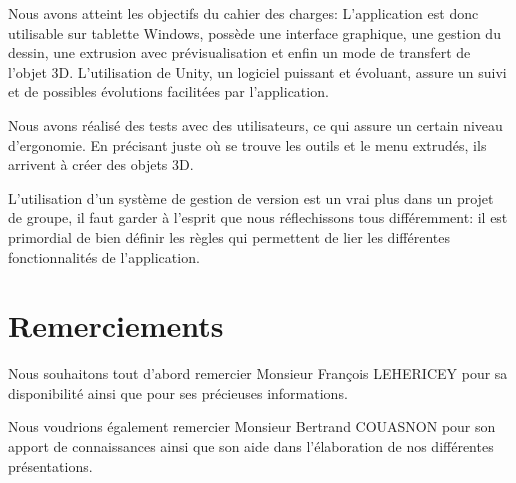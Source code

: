 \documentclass[a4paper,11pt]{article}
\begin{document}
		Nous avons atteint les objectifs du cahier des charges:
		L'application est donc utilisable sur tablette Windows, possède une interface graphique, une gestion du dessin, une extrusion avec prévisualisation et enfin un mode de transfert de l'objet 3D. L'utilisation de Unity, un logiciel puissant et évoluant, assure un suivi et de possibles évolutions facilitées par l'application.
		
		Nous avons réalisé des tests avec des utilisateurs, ce qui assure un certain niveau d'ergonomie. En précisant juste où se trouve les outils et le menu extrudés, ils arrivent à créer des objets 3D.
		
		L'utilisation d'un système de gestion de version est un vrai plus dans un projet de groupe, il faut garder à l'esprit que nous réflechissons tous différemment: il est primordial de bien définir les règles qui permettent de lier les différentes fonctionnalités de l'application.
		

	
	\section{Remerciements}
		Nous souhaitons tout d'abord remercier Monsieur François LEHERICEY pour sa disponibilité ainsi que pour ses précieuses informations.
		
		Nous voudrions également remercier Monsieur Bertrand COUASNON pour son apport de connaissances ainsi que son aide dans l'élaboration de nos différentes présentations.
		
\end{document}
